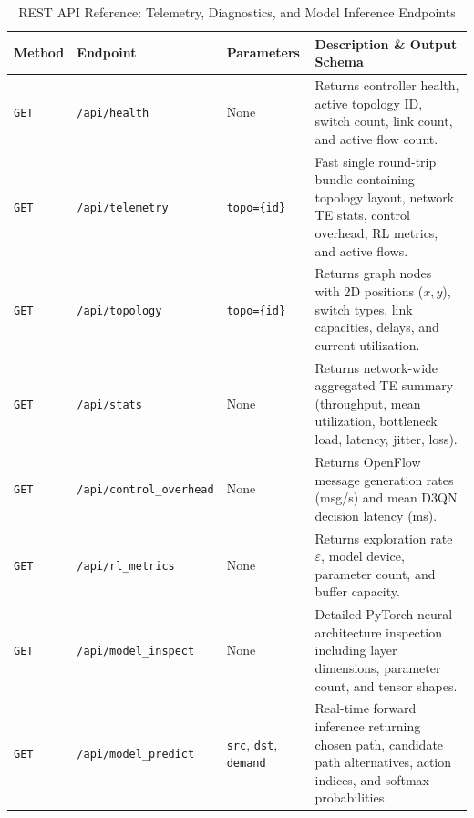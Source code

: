 \documentclass[12pt,a4paper,oneside]{report}
\begin{document}
\begin{table}[H]
\centering
\caption{REST API Reference: Telemetry, Diagnostics, and Model Inference Endpoints}
\label{tab:rest_api_telemetry}
\small
\begin{tabularx}{\textwidth}{l l p{3.0cm} X}
\toprule
\textbf{Method} & \textbf{Endpoint} & \textbf{Parameters} & \textbf{Description \& Output Schema} \\
\midrule
\texttt{GET} & \texttt{/api/health} & None & Returns controller health, active topology ID, switch count, link count, and active flow count. \\
\addlinespace
\texttt{GET} & \texttt{/api/telemetry} & \texttt{topo=\{id\}} & Fast single round-trip bundle containing topology layout, network TE stats, control overhead, RL metrics, and active flows. \\
\addlinespace
\texttt{GET} & \texttt{/api/topology} & \texttt{topo=\{id\}} & Returns graph nodes with 2D positions ($x, y$), switch types, link capacities, delays, and current utilization. \\
\addlinespace
\texttt{GET} & \texttt{/api/stats} & None & Returns network-wide aggregated TE summary (throughput, mean utilization, bottleneck load, latency, jitter, loss). \\
\addlinespace
\texttt{GET} & \texttt{/api/control\_overhead} & None & Returns OpenFlow message generation rates (msg/s) and mean D3QN decision latency (ms). \\
\addlinespace
\texttt{GET} & \texttt{/api/rl\_metrics} & None & Returns exploration rate $\varepsilon$, model device, parameter count, and buffer capacity. \\
\addlinespace
\texttt{GET} & \texttt{/api/model\_inspect} & None & Detailed PyTorch neural architecture inspection including layer dimensions, parameter count, and tensor shapes. \\
\addlinespace
\texttt{GET} & \texttt{/api/model\_predict} & \texttt{src}, \texttt{dst}, \texttt{demand} & Real-time forward inference returning chosen path, candidate path alternatives, action indices, and softmax probabilities. \\
\bottomrule
\end{tabularx}
\end{table}
\end{document}
